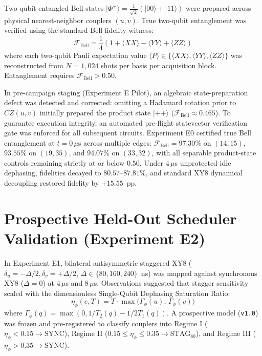 \documentclass[aps,prl,twocolumn,amsmath,amssymb,superscriptaddress,floatfix]{revtex4-2}
\begin{document}
Two-qubit entangled Bell states $|\Phi^+\rangle = \frac{1}{\sqrt{2}}(|00\rangle + |11\rangle)$ were prepared across physical nearest-neighbor couplers $(u, v)$. True two-qubit entanglement was verified using the standard Bell-fidelity witness:
\begin{equation}
\mathcal{F}_{\text{Bell}} = \frac{1}{4}\left(1 + \langle XX \rangle - \langle YY \rangle + \langle ZZ \rangle\right)
\label{eq:bell_witness}
\end{equation}
where each two-qubit Pauli expectation value $\langle P \rangle \in \{\langle XX \rangle, \langle YY \rangle, \langle ZZ \rangle\}$ was reconstructed from $N = 1{,}024$ shots per basis per acquisition block. Entanglement requires $\mathcal{F}_{\text{Bell}} > 0.50$.

In pre-campaign staging (Experiment E Pilot), an algebraic state-preparation defect was detected and corrected: omitting a Hadamard rotation prior to $CZ(u,v)$ initially prepared the product state $|++\rangle$ ($\mathcal{F}_{\text{Bell}} \approx 0.465$). To guarantee execution integrity, an automated pre-flight statevector verification gate was enforced for all subsequent circuits. Experiment E0 certified true Bell entanglement at $t = 0\,\mu$s across multiple edges: $\mathcal{F}_{\text{Bell}} = 97.30\%$ on $(14, 15)$, $93.55\%$ on $(19, 35)$, and $94.07\%$ on $(33, 32)$, with all separable product-state controls remaining strictly at or below $0.50$. Under $4\,\mu$s unprotected idle dephasing, fidelities decayed to $80.57\text{--}87.81\%$, and standard XY8 dynamical decoupling restored fidelity by $+15.55$~pp.

\section{Prospective Held-Out Scheduler Validation (Experiment E2)}
In Experiment E1, bilateral antisymmetric staggered XY8 ($\delta_u = -\Delta/2, \delta_v = +\Delta/2$, $\Delta \in \{80, 160, 240\}$~ns) was mapped against synchronous XY8 ($\Delta = 0$) at $4\,\mu$s and $8\,\mu$s. Observations suggested that stagger sensitivity scaled with the dimensionless Single-Qubit Dephasing Saturation Ratio:
\begin{equation}
\eta_\phi(e, T) = T \cdot \max\big(\Gamma_\phi(u),\, \Gamma_\phi(v)\big)
\label{eq:eta}
\end{equation}
where $\Gamma_\phi(q) = \max(0, 1/T_2(q) - 1/2T_1(q))$. A prospective model (\texttt{v1.0}) was frozen and pre-registered to classify couplers into Regime I ($\eta_\phi < 0.15 \to \text{SYNC}$), Regime II ($0.15 \le \eta_\phi \le 0.35 \to \text{STAG}_{80}$), and Regime III ($\eta_\phi > 0.35 \to \text{SYNC}$).
\end{document}
